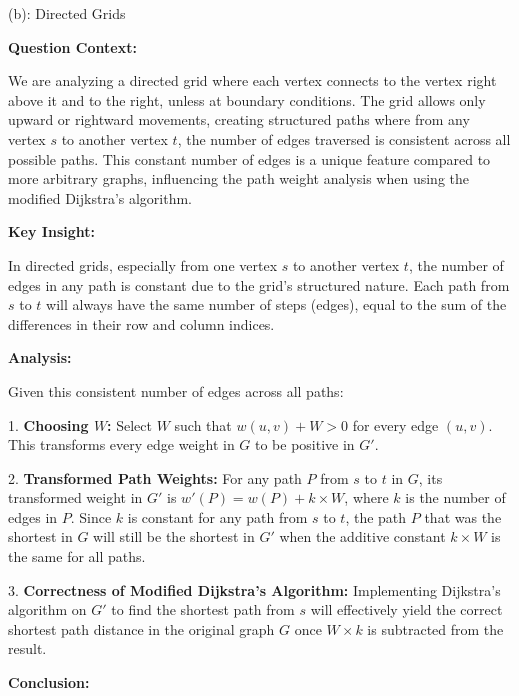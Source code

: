 \documentclass{oxmathproblems}
\begin{document}
\begin{questions}
(b): Directed Grids

\textbf{Question Context:}

We are analyzing a directed grid where each vertex connects to the vertex right above it and to the right, unless at boundary conditions. The grid allows only upward or rightward movements, creating structured paths where from any vertex \( s \) to another vertex \( t \), the number of edges traversed is consistent across all possible paths. This constant number of edges is a unique feature compared to more arbitrary graphs, influencing the path weight analysis when using the modified Dijkstra's algorithm.

\textbf{Key Insight:}

In directed grids, especially from one vertex \( s \) to another vertex \( t \), the number of edges in any path is constant due to the grid’s structured nature. Each path from \( s \) to \( t \) will always have the same number of steps (edges), equal to the sum of the differences in their row and column indices.

\textbf{Analysis:}

Given this consistent number of edges across all paths:

1. \textbf{Choosing \( W \):} Select \( W \) such that \( w(u,v) + W > 0 \) for every edge \( (u,v) \). This transforms every edge weight in \( G \) to be positive in \( G' \).

2. \textbf{Transformed Path Weights:} For any path \( P \) from \( s \) to \( t \) in \( G \), its transformed weight in \( G' \) is \( w'(P) = w(P) + k \times W \), where \( k \) is the number of edges in \( P \). Since \( k \) is constant for any path from \( s \) to \( t \), the path \( P \) that was the shortest in \( G \) will still be the shortest in \( G' \) when the additive constant \( k \times W \) is the same for all paths.

3. \textbf{Correctness of Modified Dijkstra’s Algorithm:} Implementing Dijkstra's algorithm on \( G' \) to find the shortest path from \( s \) will effectively yield the correct shortest path distance in the original graph \( G \) once \( W \times k \) is subtracted from the result.

\textbf{Conclusion:}


\end{questions}
\end{document}
